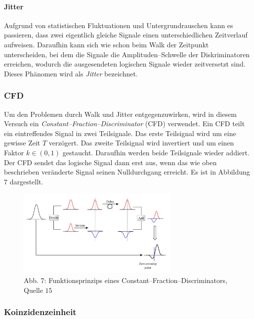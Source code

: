 \documentclass[12pt,a4paper]{scrartcl}
\numberwithin{equation}{section} %
\renewcommand{\[}{} %
\renewcommand{\]}{\noindent} %
\begin{document}
\hypertarget{jitter}{%
\paragraph{Jitter}\label{jitter}}

Aufgrund von statistischen Fluktuationen und Untergrundrauschen kann es
passieren, dass zwei eigentlich gleiche Signale einen unterschiedlichen
Zeitverlauf aufweisen. Daraufhin kann sich wie schon beim Walk der
Zeitpunkt unterscheiden, bei dem die Signale die Amplituden--Schwelle
der Diskriminatoren erreichen, wodurch die ausgesendeten logischen
Signale wieder zeitversetzt sind. Dieses Phänomen wird als \emph{Jitter}
bezeichnet.

\hypertarget{cfd}{%
\subsubsection{CFD}\label{cfd}}

Um den Problemen durch Walk und Jitter entgegenzuwirken, wird in diesem
Versuch ein \emph{Constant--Fraction--Discriminator} (CFD) verwendet.
Ein CFD teilt ein eintreffendes Signal in zwei Teilsignale. Das erste
Teilsignal wird um eine gewisse Zeit \(T\) verzögert. Das zweite
Teilsignal wird invertiert und um einen Faktor \(k\in(0, 1)\) gestaucht.
Daraufhin werden beide Teilsignale wieder addiert. Der CFD sendet das
logische Signal dann erst aus, wenn das wie oben beschrieben veränderte
Signal seinen Nulldurchgang erreicht. Es ist in Abbildung \(7\)
dargestellt.

\begin{figure}
	\centering
	\includegraphics[width=0.7\textwidth]{../media/B3.4/CFD.jpg}
	\caption{Abb. 7: Funktionsprinzips eines Constant--Fraction--Discriminators, Quelle $15$}
	\label{abb:CFD}
\end{figure}

\hypertarget{koinzidenzeinheit}{%
\subsubsection{Koinzidenzeinheit}\label{koinzidenzeinheit}}
\end{document}
